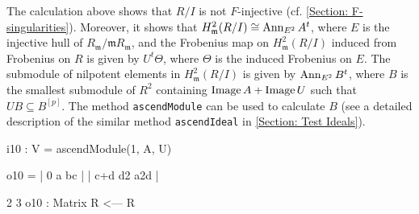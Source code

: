 \documentclass{amsart}
\begin{document}
\begin{example}
The calculation above shows that $R/I$ is not $F$-injective (cf. \autoref{Section: F-singularities}).
Moreover, it shows that $H^2_{\mathfrak{m}} (R/I)\cong \operatorname{{Ann}}_{E^2} A^t$,
where $E$ is the injective hull of $R_{\mathfrak{m}}/ {\mathfrak{m}} R_{\mathfrak{m}}$,
and the Frobenius map on  $H^2_{\mathfrak{m}} (R/I)$ induced from Frobenius on $R$
is given by $U^t \Theta$, where $\Theta$ is the induced Frobenius on $E$.
The submodule of nilpotent elements in  $H^2_{\mathfrak{m}} (R/I)$ is
given by $\operatorname{{Ann}}_{E^2} B^t$, where $B$ is the smallest submodule of $R^2$ containing $\operatorname{Image} A + \operatorname{Image} U$ such that $U  B \subseteq B^{[p]}$.
The method \texttt{ascendModule} can be used to calculate  $B$ (see a detailed description of the similar method \texttt{ascendIdeal} in \autoref{Section: Test Ideals}).

\medskip
{\small{}
\begin{MyVerbatim}
i10 : V = ascendModule(1, A, U)

o10 = | 0   a  bc  |
      | c+d d2 a2d |

              2       3
o10 : Matrix R  <--- R
\end{MyVerbatim}
}\medskip


\end{example}





\end{document}
